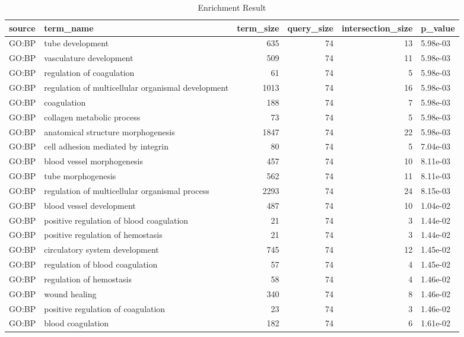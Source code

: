 \documentclass[
]{book}
\begin{document}
\begin{table}
\centering
\caption{\label{tab:unnamed-chunk-18}Enrichment Result}
\centering
\fontsize{10}{12}\selectfont
\begin{tabular}[t]{l|l|r|r|r|l}
\hline
source & term\_name & term\_size & query\_size & intersection\_size & p\_value\\
\hline
GO:BP & tube development & 635 & 74 & 13 & 5.98e-03\\
\hline
GO:BP & vasculature development & 509 & 74 & 11 & 5.98e-03\\
\hline
GO:BP & regulation of coagulation & 61 & 74 & 5 & 5.98e-03\\
\hline
GO:BP & regulation of multicellular organismal development & 1013 & 74 & 16 & 5.98e-03\\
\hline
GO:BP & coagulation & 188 & 74 & 7 & 5.98e-03\\
\hline
GO:BP & collagen metabolic process & 73 & 74 & 5 & 5.98e-03\\
\hline
GO:BP & anatomical structure morphogenesis & 1847 & 74 & 22 & 5.98e-03\\
\hline
GO:BP & cell adhesion mediated by integrin & 80 & 74 & 5 & 7.04e-03\\
\hline
GO:BP & blood vessel morphogenesis & 457 & 74 & 10 & 8.11e-03\\
\hline
GO:BP & tube morphogenesis & 562 & 74 & 11 & 8.11e-03\\
\hline
GO:BP & regulation of multicellular organismal process & 2293 & 74 & 24 & 8.15e-03\\
\hline
GO:BP & blood vessel development & 487 & 74 & 10 & 1.04e-02\\
\hline
GO:BP & positive regulation of blood coagulation & 21 & 74 & 3 & 1.44e-02\\
\hline
GO:BP & positive regulation of hemostasis & 21 & 74 & 3 & 1.44e-02\\
\hline
GO:BP & circulatory system development & 745 & 74 & 12 & 1.45e-02\\
\hline
GO:BP & regulation of blood coagulation & 57 & 74 & 4 & 1.45e-02\\
\hline
GO:BP & regulation of hemostasis & 58 & 74 & 4 & 1.46e-02\\
\hline
GO:BP & wound healing & 340 & 74 & 8 & 1.46e-02\\
\hline
GO:BP & positive regulation of coagulation & 23 & 74 & 3 & 1.46e-02\\
\hline
GO:BP & blood coagulation & 182 & 74 & 6 & 1.61e-02\\
\hline
\end{tabular}
\end{table}
\end{document}
